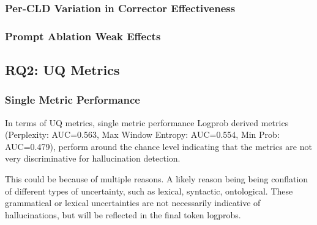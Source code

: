 \subsubsection{Per-CLD Variation in Corrector Effectiveness}

\subsubsection{Prompt Ablation Weak Effects}

\subsection{RQ2: UQ Metrics}
\label{sec:discussion_rq2}

\subsubsection{Single Metric Performance}

In terms of UQ metrics, single metric performance Logprob derived metrics (Perplexity: AUC=0.563, Max Window Entropy: AUC=0.554, Min Prob: AUC=0.479), perform around the chance level indicating that the metrics are not very discriminative for hallucination detection.

This could be because of multiple reasons. A likely reason being being conflation of different types of uncertainty, such as lexical, syntactic, ontological. These grammatical or lexical uncertainties are not necessarily indicative of hallucinations, but will be reflected in the final token logprobs.

